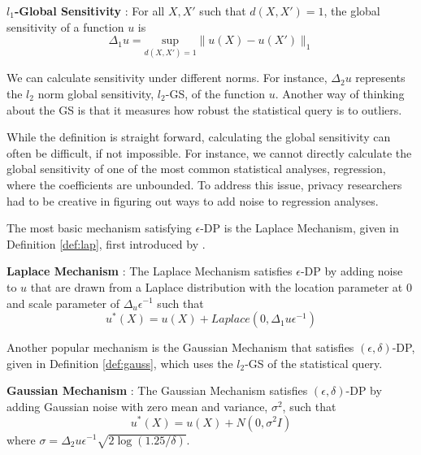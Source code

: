 \begin{defn}\label{def:gs} \textbf{$l_1$-Global Sensitivity} \citep{dwork2006calibrating}:
For all $X,X'$ such that $d(X,X')=1$, the global sensitivity of a function $u$ is
    \begin{equation}\label{eqn:gs}
        \Delta_1 u= \underset{d(X,X')=1}{\text{sup}} \|u(X)-u(X') \|_1 
    \end{equation}
\end{defn}

We can calculate sensitivity under different norms. For instance, $\Delta_2 u$ represents the $l_2$ norm global sensitivity, $l_2$-GS, of the function $u$. Another way of thinking about the GS is that it measures how robust the statistical query is to outliers.

While the definition is straight forward, calculating the global sensitivity can often be difficult, if not impossible. For instance, we cannot directly calculate the global sensitivity of one of the most common statistical analyses, regression, where the coefficients are unbounded. To address this issue, privacy researchers had to be creative in figuring out ways to add noise to regression analyses.

The most basic mechanism satisfying $\epsilon$-DP is the Laplace Mechanism, given in Definition \ref{def:lap}, first introduced by \citet{dwork2006calibrating}.

\begin{defn}\textbf{Laplace Mechanism} \citep{dwork2006calibrating}: \label{def:lap}
The Laplace Mechanism satisfies $\epsilon$-DP by adding noise to $u$ that are drawn from a Laplace distribution with the location parameter at 0 and scale parameter of $\Delta_u\epsilon^{-1}$ such that 
    \begin{equation}\label{eqn:lap}
        u^\ast(X)=u(X)+Laplace\left(0,\Delta_1 u \epsilon^{-1}\right)
    \end{equation}
\end{defn}

Another popular mechanism is the Gaussian Mechanism that satisfies $(\epsilon, \delta)$-DP, given in Definition \ref{def:gauss}, which uses the $l_2$-GS of the statistical query.

\begin{defn}\label{def:gauss} \textbf{Gaussian Mechanism} \citep{dwork2014algorithmic}:
    The Gaussian Mechanism satisfies $(\epsilon,\delta)$-DP by adding Gaussian noise with zero mean and variance, $\sigma^2$, such that
        \begin{equation}\label{eqn:gauss}
            u^\ast(X)=u(X)+N\left(0, \sigma^2 I \right)
        \end{equation}
    where $\sigma=\Delta_2 u \epsilon^{-1} \sqrt{2 \log(1.25/\delta)}$. 
\end{defn}

